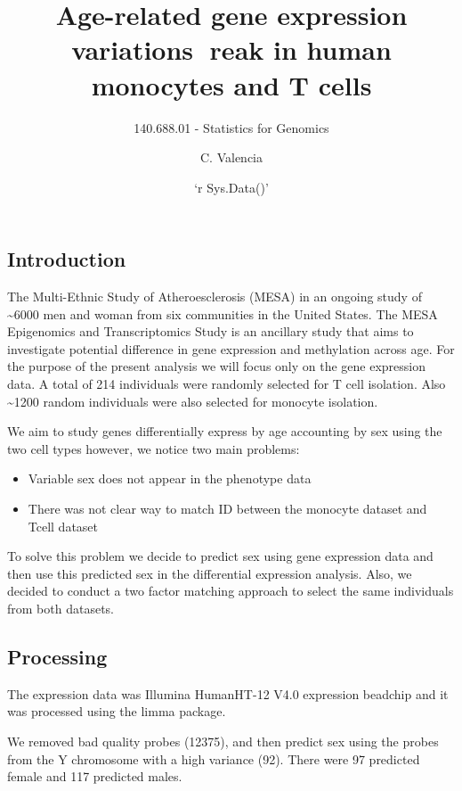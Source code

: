 \documentclass[]{article}
\title{Age-related gene expression variations reak in human monocytes and T
cells}
\subtitle{140.688.01 - Statistics for Genomics}
\author{C. Valencia}
\date{`r Sys.Data()'}
\providecommand{\tightlist}{%
  \setlength{\itemsep}{0pt}\setlength{\parskip}{0pt}}
\begin{document}
\maketitle

\hypertarget{introduction}{%
\subsection{Introduction}\label{introduction}}

The Multi-Ethnic Study of Atheroesclerosis (MESA) in an ongoing study of
\textasciitilde{}6000 men and woman from six communities in the United
States. The MESA Epigenomics and Transcriptomics Study is an ancillary
study that aims to investigate potential difference in gene expression
and methylation across age. For the purpose of the present analysis we
will focus only on the gene expression data. A total of 214 individuals
were randomly selected for T cell isolation. Also \textasciitilde{}1200
random individuals were also selected for monocyte isolation.

We aim to study genes differentially express by age accounting by sex
using the two cell types however, we notice two main problems:

\begin{itemize}
\tightlist
\item
  Variable sex does not appear in the phenotype data
\item
  There was not clear way to match ID between the monocyte dataset and
  Tcell dataset
\end{itemize}

To solve this problem we decide to predict sex using gene expression
data and then use this predicted sex in the differential expression
analysis. Also, we decided to conduct a two factor matching approach to
select the same individuals from both datasets.

\hypertarget{processing}{%
\subsection{Processing}\label{processing}}

The expression data was Illumina HumanHT-12 V4.0 expression beadchip and
it was processed using the limma package.

We removed bad quality probes (12375), and then predict sex using the
probes from the Y chromosome with a high variance (92). There were 97
predicted female and 117 predicted males.
\end{document}
